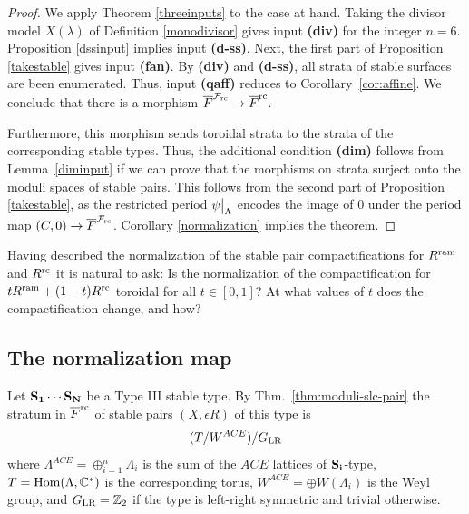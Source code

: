 \documentclass[table,x11names]{amsart}
\begin{document}
\begin{proof} We apply Theorem \ref{threeinputs} to the case at hand.
Taking the divisor model
$X(\lambda)$ of Definition \ref{monodivisor} gives input {\bf (div)} for the integer $n=6$.
Proposition \ref{dssinput} implies input {\bf (d-ss)}. Next, the first part of Proposition 
\ref{takestable} gives input {\bf (fan)}. By {\bf (div)} and {\bf (d-ss)},
all strata of stable surfaces are been enumerated.
Thus, input {\bf (qaff)} reduces to
Corollary~\ref{cor:affine}. 
We conclude that there is a morphism ${\overline F}^{{\mathcal F}_{\rm rc}}\to {\overline F}^{{\rm rc}}$.

Furthermore, this morphism sends toroidal strata to the strata of the corresponding
stable types. Thus, the additional condition {\bf (dim)} follows from Lemma~\ref{diminput}
if we can prove that the morphisms on strata surject onto the
moduli spaces of stable pairs. This follows from the second part of
Proposition \ref{takestable}, as the restricted period $\psi\big{|}_\Lambda$
encodes the image of $0$ under the period map $(C,0)\to {\overline F}^{{\mathcal F}_{\rm rc}}$.
Corollary \ref{normalization} implies the theorem.
\end{proof}
 
\begin{question} Having described the normalization of the stable pair compactifications for $R^{\rm ram}$ and $R^{\rm rc}$ it is natural to ask: Is the normalization of the compactification for $tR^{\rm ram}+(1-t)R^{\rm rc}$ toroidal for all $t\in [0,1]$? At what values of $t$ does the compactification change, and how? \end{question}



\subsection{The normalization map}
\label{sec:normalization}

Let ${\bf S_1\cdots S_N}$ be a Type III stable type. By
Thm.~\ref{thm:moduli-slc-pair} the stratum in ${\overline F}^{{\rm rc}}$ of stable pairs
$(X,\epsilon R)$ of this type is
\begin{displaymath}
  (T / W^{ACE}) / G_{{\rm LR}}
\end{displaymath}
where $\Lambda^{ACE} = \oplus_{i=1}^n\Lambda_i$ is the sum of the $ACE$
lattices of ${\bf S_i}$-type, $T = \operatorname{Hom}(\Lambda, {\mathbb C}^*)$ is the
corresponding torus, $W^{ACE} = \oplus W(\Lambda_i)$ is the Weyl group,
and $G_{\rm LR} = {\mathbb Z}_2$ if
the type is left-right symmetric and trivial otherwise.
\end{document}
